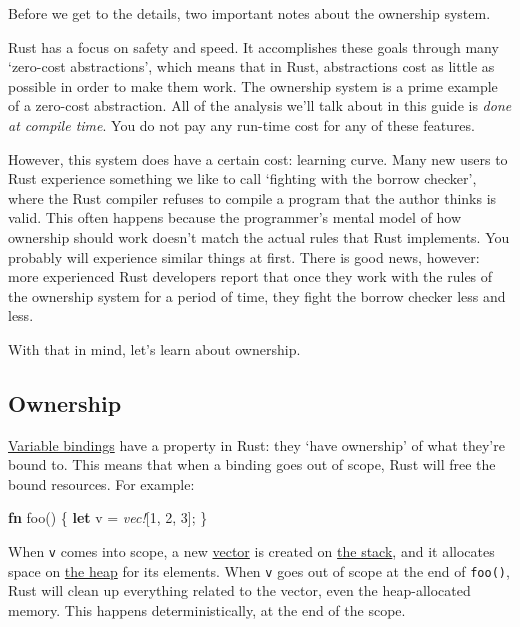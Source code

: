 \documentclass[a4paper,]{book}
\newenvironment{Shaded}{\begin{snugshade}}{\end{snugshade}}
\newcommand{\KeywordTok}[1]{\textcolor[rgb]{0.13,0.29,0.53}{\textbf{{#1}}}}
\newcommand{\DecValTok}[1]{\textcolor[rgb]{0.00,0.00,0.81}{{#1}}}
\newcommand{\PreprocessorTok}[1]{\textcolor[rgb]{0.56,0.35,0.01}{\textit{{#1}}}}
\newcommand{\NormalTok}[1]{{#1}}
\begin{document}
Before we get to the details, two important notes about the ownership
system.

Rust has a focus on safety and speed. It accomplishes these goals
through many `zero-cost abstractions', which means that in Rust,
abstractions cost as little as possible in order to make them work. The
ownership system is a prime example of a zero-cost abstraction. All of
the analysis we'll talk about in this guide is \emph{done at compile
time}. You do not pay any run-time cost for any of these features.

However, this system does have a certain cost: learning curve. Many new
users to Rust experience something we like to call `fighting with the
borrow checker', where the Rust compiler refuses to compile a program
that the author thinks is valid. This often happens because the
programmer's mental model of how ownership should work doesn't match the
actual rules that Rust implements. You probably will experience similar
things at first. There is good news, however: more experienced Rust
developers report that once they work with the rules of the ownership
system for a period of time, they fight the borrow checker less and
less.

With that in mind, let's learn about ownership.

\subsection{Ownership}\label{ownership}

\protect\hyperlink{sec--variable-bindings}{Variable bindings} have a
property in Rust: they `have ownership' of what they're bound to. This
means that when a binding goes out of scope, Rust will free the bound
resources. For example:

\begin{Shaded}
\begin{Highlighting}[]
\KeywordTok{fn} \NormalTok{foo() \{}
    \KeywordTok{let} \NormalTok{v = }\PreprocessorTok{vec!}\NormalTok{[}\DecValTok{1}\NormalTok{, }\DecValTok{2}\NormalTok{, }\DecValTok{3}\NormalTok{];}
\NormalTok{\}}
\end{Highlighting}
\end{Shaded}

When \texttt{v} comes into scope, a new
\protect\hyperlink{sec--vectors}{vector} is created on
\protect\hyperlink{the-stack}{the stack}, and it allocates space on
\protect\hyperlink{sec--the-stack-and-the-heap}{the heap} for its
elements. When \texttt{v} goes out of scope at the end of
\texttt{foo()}, Rust will clean up everything related to the vector,
even the heap-allocated memory. This happens deterministically, at the
end of the scope.
\end{document}

